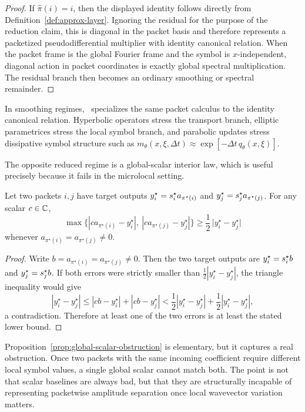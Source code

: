 \begin{proof}
If $\hat\pi(i)=i$, then the displayed identity follows directly from Definition~\ref{def:approx-layer}. Ignoring the residual for the purpose of the reduction claim, this is diagonal in the packet basis and therefore represents a packetized pseudodifferential multiplier with identity canonical relation. When the packet frame is the global Fourier frame and the symbol is $x$-independent, diagonal action in packet coordinates is exactly global spectral multiplication. The residual branch then becomes an ordinary smoothing or spectral remainder.
\end{proof}

In smoothing regimes, \MiNO\ specializes the same packet calculus to the identity canonical relation.  Hyperbolic operators stress the transport branch, elliptic parametrices stress the local symbol branch, and parabolic updates stress dissipative symbol structure such as $m_\theta(x,\xi,\Delta t)\approx \exp[-\Delta t\,q_\theta(x,\xi)]$.

The opposite reduced regime is a global-scalar interior law, which is useful precisely because it fails in the microlocal setting.

\begin{proposition}
\label{prop:global-scalar-obstruction}
Let two packets $i,j$ have target outputs $y_i^\star=s^\star_i a_{\pi^\star(i)}$ and $y_j^\star=s^\star_j a_{\pi^\star(j)}$. For any scalar $c\in\mathbb C$,
\[
\max\{|ca_{\pi^\star(i)}-y_i^\star|,\ |ca_{\pi^\star(j)}-y_j^\star|\}
\ge \frac12\,\bigl|y_i^\star-y_j^\star\bigr|
\]
whenever $a_{\pi^\star(i)}=a_{\pi^\star(j)}\neq 0$.
\end{proposition}

\begin{proof}
Write $b=a_{\pi^\star(i)}=a_{\pi^\star(j)}\neq 0$. Then the two target outputs are $y_i^\star=s^\star_i b$ and $y_j^\star=s^\star_j b$. If both errors were strictly smaller than $\frac12 |y_i^\star-y_j^\star|$, the triangle inequality would give
\[
|y_i^\star-y_j^\star|
\le |cb-y_i^\star| + |cb-y_j^\star|
< \frac12 |y_i^\star-y_j^\star| + \frac12 |y_i^\star-y_j^\star|,
\]
a contradiction. Therefore at least one of the two errors is at least the stated lower bound.
\end{proof}

Proposition~\ref{prop:global-scalar-obstruction} is elementary, but it captures a real obstruction. Once two packets with the same incoming coefficient require different local symbol values, a single global scalar cannot match both. The point is not that scalar baselines are always bad, but that they are structurally incapable of representing packetwise amplitude separation once local wavevector variation matters.

